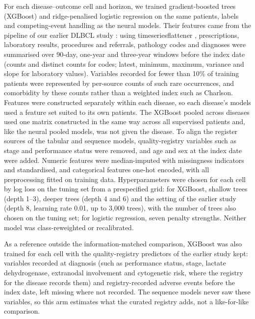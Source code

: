 For each disease--outcome cell and horizon, we trained gradient-boosted trees
(XGBoost) \citep{chen2016xgboost} and ridge-penalised logistic regression on the
same patients, labels and competing-event handling as the neural models. Their
features came from the pipeline of our earlier DLBCL study
\citep{werling2026dlbcl}: using timeseriesflattener
\citep{bernstorff2023tsflattener}, prescriptions, laboratory results,
procedures and referrals, pathology codes and diagnoses were summarised over
90-day, one-year and three-year windows before the index date (counts and
distinct counts for codes; latest, minimum, maximum, variance and slope for
laboratory values). Variables recorded for fewer than 10\% of training patients
were represented by per-source counts of such rare occurrences, and comorbidity
by these counts rather than a weighted index such as Charlson. Features were
constructed separately within each disease, so each disease's models used a
feature set suited to its own patients. The XGBoost pooled across diseases used
one matrix constructed in the same way across all supervised patients and, like
the neural pooled models, was not given the disease. To align the register
sources of the tabular and sequence models, quality-registry variables such as
stage and performance status were removed, and age and sex at the index date
were added. Numeric features were median-imputed with missingness indicators and
standardised, and categorical features one-hot encoded, with all preprocessing
fitted on training data. Hyperparameters were chosen for each cell by log loss
on the tuning set from a prespecified grid: for XGBoost, shallow trees (depth
1--3), deeper trees (depth 4 and 6) and the setting of the earlier study
(depth 8, learning rate 0.01, up to 3,000 trees), with the number of trees also
chosen on the tuning set; for logistic regression, seven penalty strengths.
Neither model was class-reweighted or recalibrated. 

As a reference outside the information-matched comparison, XGBoost was also
trained for each cell with the quality-registry predictors of the earlier
study kept: variables recorded at diagnosis (such as performance status, stage,
lactate dehydrogenase, extranodal involvement and cytogenetic risk, where the
registry for the disease records them) and registry-recorded adverse events
before the index date, left missing where not recorded. The sequence models
never saw these variables, so this arm estimates what the curated registry
adds, not a like-for-like comparison.

